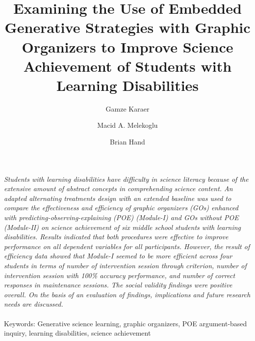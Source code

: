 \documentclass[11.5pt]{sig-alternate} %
\makeatletter
\let\oldabstract\abstract
\let\oldendabstract\endabstract
\renewenvironment{abstract} %
{\renewenvironment{quotation}%
               {\list{}{\addtolength{\leftmargin}{1em} %
                        \listparindent 1.5em%
                        \itemindent    \listparindent%
                        \rightmargin   \leftmargin%
                        \parsep        \z@ \@plus\p@}%
                \item\relax}%
               {\endlist}%
\oldabstract}
{\oldendabstract}
\makeatother
\begin{document}
\title{Examining the Use of Embedded Generative Strategies with Graphic Organizers to Improve Science Achievement of Students with Learning Disabilities}

\author[1]{\large \color{blue} Gamze Karaer}
\author[2]{\large \color{blue} Macid A. Melekoglu}
\author[3]{\large \color{blue} Brian Hand}

\toappear{} %

\maketitle %
\begin{@twocolumnfalse} 
\begin{abstract}
\item %
\begin{large}
\textit{Students with learning disabilities have difficulty in science literacy because of the extensive amount of abstract concepts in comprehending science content. An adapted alternating treatments design with an extended baseline was used to compare the effectiveness and efficiency of graphic organizers (GOs) enhanced with predicting-observing-explaining (POE) (Module-I) and GOs without POE (Module-II) on science achievement of six middle school students with learning disabilities. Results indicated that both procedures were effective to improve performance on all dependent variables for all participants. However, the result of efficiency data showed that Module-I seemed to be more efficient across four students in terms of number of intervention session through criterion, number of intervention session with 100\% accuracy performance, and number of correct responses in maintenance sessions. The social validity findings were positive overall. On the basis of an evaluation of findings, implications and future research needs are discussed.} \\ \\
Keywords: Generative science learning, graphic organizers, POE argument-based inquiry, learning disabilities, science achievement

\end{large}     
\end{abstract}
\end{@twocolumnfalse}
\end{document}
